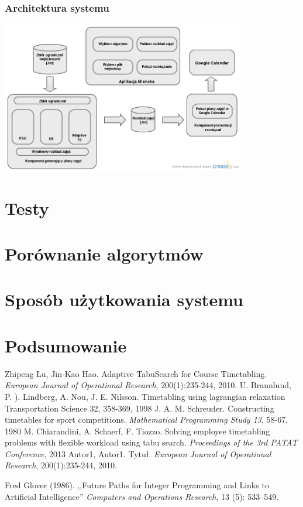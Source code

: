 \documentclass[11pt]{report}
\begin{document}
\subsection{Architektura systemu}
\par
\includegraphics[width=0.8\textwidth]{ComponentsDiagram.png}
\chapter{Testy}
\chapter{Porównanie algorytmów}
\chapter{Sposób użytkowania systemu}
\chapter{Podsumowanie}

\begin{thebibliography}{2}
 Zhipeng Lu, Jin-Kao Hao. Adaptive TabuSearch for Course Timetabling.  \emph{European Journal of Operational Research}, 200(1):235-244, 2010.
 U. Brannlund, P. ). Lindberg, A. Nou, J. E. Nilsson. Timetabling using lagrangian relaxation Transportation Science 32, 358-369, 1998
 J. A. M. Schreuder. Constructing timetables for sport competitions. \emph{Mathematical Programming Study 13}, 58-67, 1980
 M. Chiarandini, A. Schaerf, F. Tiozzo. Solving employee timetabling problems with flexible workload using tabu search. \emph{Proceedings of the 3rd PATAT Conference}, 2013
 Autor1, Autor1. Tytuł.  \emph{European Journal of Operational Research}, 200(1):235-244, 2010.

 Fred Glover (1986). ,,Future Paths for Integer Programming and Links to Artificial Intelligence'' \emph{Computers and Operations Research}, 13 (5): 533–549.

\end{thebibliography}
\end{document}
